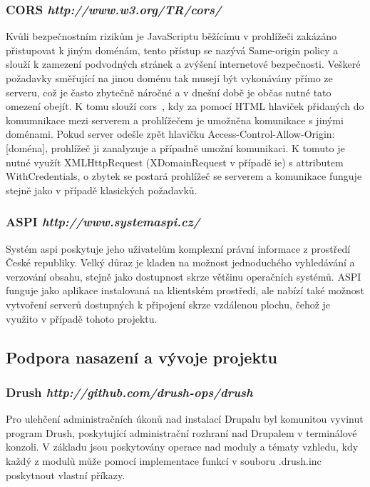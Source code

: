 \subsubsection*{CORS \hfill \emph{http://www.w3.org/TR/cors/}} 
Kvůli bezpečnostním rizikům je JavaScriptu běžícímu v prohlížeči zakázáno přistupovat k jiným doménám, tento přístup se nazývá Same-origin policy a slouží k zamezení podvodných stránek a zvýšení internetové bezpečnosti. Veškeré požadavky směřující na jinou doménu tak musejí být vykonávány přímo ze serveru, což je často zbytečně náročné a v dnešní době je občas nutné tato omezení obejít. K tomu slouží \gls{cors}~\cite{cors}, kdy za pomocí HTML hlaviček přidaných do komumnikace mezi serverem a prohlížečem je umožněna komunikace s jinými doménami. Pokud server odešle zpět hlavičku Access-Control-Allow-Origin: [doména], prohlížeč ji zanalyzuje a případně umožní komunikaci. K tomuto je nutné využít XMLHttpRequest (XDomainRequest v případě \gls{ie}) s attributem WithCredentials, o zbytek se postará prohlížeč se serverem a komunikace funguje stejně jako v případě klasických požadavků.

\subsubsection*{ASPI \hfill \emph{http://www.systemaspi.cz/}}
Systém aspi poskytuje jeho uživatelům komplexní právní informace z prostředí České republiky. Velký důraz je kladen na možnost jednoduchého vyhledávání a verzování obsahu, stejně jako dostupnost skrze většinu operačních systémů. ASPI funguje jako aplikace instalovaná na klientském prostředí, ale nabízí také možnost vytvoření serverů dostupných k připojení skrze vzdálenou plochu, čehož je využito v případě tohoto projektu.

\subsection{Podpora nasazení a vývoje projektu}

\subsubsection*{Drush \hfill \emph{http://github.com/drush-ops/drush}}
\label{subsec:drush}
Pro ulehčení administračních úkonů nad instalací Drupalu byl komunitou vyvinut program Drush, poskytující administrační rozhraní nad Drupalem v terminálové konzoli. V základu jsou poskytovány operace nad moduly a tématy vzhledu, kdy každý z modulů může pomocí implementace funkcí v souboru .drush.inc poskytnout vlastní příkazy.


